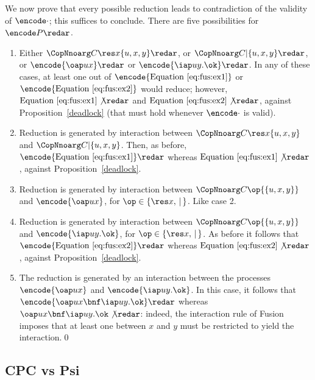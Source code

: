 \documentclass{LMCS}
\begin{document}
We now prove that every possible reduction leads to contradiction of the validity of $\encode\cdot$;
this suffices to conclude. There are five possibilities for $\encode P \redar$.
\begin{enumerate}
	\item Either $\CopNnoarg C {\res x} {\{u,x,y\}} \redar$, or
				$\CopNnoarg C | {\{u,x,y\}} \redar$, or 
				$\encode{\oap u x}\redar$ or $\encode{\iap u y.\ok}\redar$. In any
				of these cases, at least one out of 
				$\encode{\mbox{Equation~\ref{eq:fus:ex1}}}$ or
				$\encode{\mbox{Equation~\ref{eq:fus:ex2}}}$ would reduce;
				however, $\mbox{Equation~\ref{eq:fus:ex1}} \not\redar$ and
				$\mbox{Equation~\ref{eq:fus:ex2}} \not\redar$, 
				against Proposition~\ref{deadlock} (that must hold whenever $\encode\cdot$
				is valid).

	\item Reduction is generated by interaction between
				$\CopNnoarg C {\res x} {\{u,x,y\}}$ and
				$\CopNnoarg C | {\{u,x,y\}}$.  Then, as before, 
				$\encode{\mbox{Equation~\ref{eq:fus:ex1}}} \redar$
				whereas $\mbox{Equation~\ref{eq:fus:ex1}} \not\redar$, 
				against Proposition~\ref{deadlock}.

	\item Reduction is generated by interaction between
				$\CopNnoarg C \op {\{u,x,y\}}$ and $\encode{\oap u x}$, for
				$\op \in \{\res x,\,|\,\}$. Like case 2.

	\item Reduction is generated by interaction between
				$\CopNnoarg C \op {\{u,x,y\}}$ and $\encode{\iap u y.\ok}$, for
				$\op \in \{\res x,\,|\,\}$. As before it follows that
				$\encode{\mbox{Equation~\ref{eq:fus:ex2}}} \redar$
				whereas $\mbox{Equation~\ref{eq:fus:ex2}} \not\redar$, 
				against Proposition~\ref{deadlock}.

	\item The reduction is generated by an interaction between the processes
				$\encode{\oap u x}$ and $\encode{\iap u y.\ok}$. In this
				case, it follows that $\encode{\oap u x\bnf \iap u y.\ok}\redar$
				whereas $\oap u x\bnf \iap u y.\ok\not\redar$: indeed, the interaction
				rule of Fusion imposes that at least one between $x$ and $y$ must
				be restricted to yield the interaction.\qed
\end{enumerate}

\subsection{CPC vs Psi}
\end{document}
